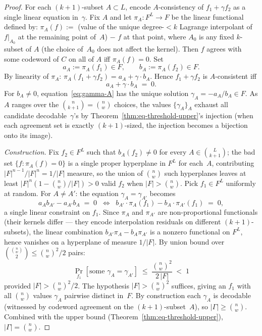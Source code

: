 \documentclass[11pt]{article}
\begin{document}
\begin{proof}
For each $(k+1)$-subset $A \subset L$, encode $A$-consistency of $f_1 + \gamma f_2$ as a single linear equation in~$\gamma$. Fix $A$ and let $\pi_A : F^L \to F$ be the linear functional defined by: $\pi_A(f) :=$ (value of the unique degree-${<}k$ Lagrange interpolant of $f|_{A_0}$ at the remaining point of~$A$) $-$ $f$ at that point, where $A_0$ is any fixed $k$-subset of $A$ (the choice of~$A_0$ does not affect the kernel). Then $f$ agrees with some codeword of $C$ on all of $A$ iff $\pi_A(f) = 0$. Set
$$a_A := \pi_A(f_1) \in F, \qquad b_A := \pi_A(f_2) \in F.$$
By linearity of $\pi_A$: $\pi_A(f_1 + \gamma f_2) = a_A + \gamma \cdot b_A$. Hence $f_1 + \gamma f_2$ is $A$-consistent iff
\begin{equation}
\label{eq:gamma-A}
a_A + \gamma \cdot b_A \;=\; 0.
\end{equation}
For $b_A \neq 0$, equation~\eqref{eq:gamma-A} has the unique solution $\gamma_A = -a_A/b_A \in F$. As $A$ ranges over the $\binom{n}{k+1} = \binom{n}{w}$ choices, the values $\{\gamma_A\}_A$ exhaust all candidate decodable~$\gamma$'s by Theorem~\ref{thm:eq-threshold-upper}'s injection (when each agreement set is exactly $(k{+}1)$-sized, the injection becomes a bijection onto its image).

\emph{Construction.} Fix $f_2 \in F^L$ such that $b_A(f_2) \neq 0$ for every $A \in \binom{L}{k+1}$; the bad set $\{f : \pi_A(f) = 0\}$ is a single proper hyperplane in $F^L$ for each~$A$, contributing $|F|^{n-1}/|F|^n = 1/|F|$ measure, so the union of $\binom{n}{w}$ such hyperplanes leaves at least $|F|^n (1 - \binom{n}{w}/|F|) > 0$ valid $f_2$ when $|F| > \binom{n}{w}$. Pick $f_1 \in F^L$ uniformly at random. For $A \neq A'$: the equation $\gamma_A = \gamma_{A'}$ becomes
$$a_A b_{A'} - a_{A'} b_A \;=\; 0 \;\;\Longleftrightarrow\;\; b_{A'} \cdot \pi_A(f_1) - b_A \cdot \pi_{A'}(f_1) \;=\; 0,$$
a single linear constraint on $f_1$. Since $\pi_A$ and $\pi_{A'}$ are non-proportional functionals (their kernels differ — they encode interpolation residuals on different $(k{+}1)$-subsets), the linear combination $b_{A'} \pi_A - b_A \pi_{A'}$ is a nonzero functional on $F^L$, hence vanishes on a hyperplane of measure $1/|F|$. By union bound over $\binom{\binom{n}{w}}{2} \leq \binom{n}{w}^2/2$ pairs:
$$\Pr_{f_1}[\text{some } \gamma_A = \gamma_{A'}] \;\leq\; \frac{\binom{n}{w}^2}{2 \, |F|} \;<\; 1$$
provided $|F| > \binom{n}{w}^2/2$. The hypothesis $|F| > \binom{n}{w}^2$ suffices, giving an $f_1$ with all $\binom{n}{w}$ values $\gamma_A$ pairwise distinct in~$F$. By construction each $\gamma_A$ is decodable (witnessed by codeword agreement on the $(k{+}1)$-subset~$A$), so $|\Gamma| \geq \binom{n}{w}$. Combined with the upper bound (Theorem~\ref{thm:eq-threshold-upper}), $|\Gamma| = \binom{n}{w}$.


\end{proof}
\end{document}
